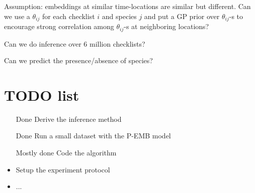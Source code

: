 \documentclass{article}
\begin{document}
Assumption: embeddings at similar time-locations are similar but different. Can we use a $\theta_{ij}$ for each checklist $i$ and species $j$ and put a GP prior over $\theta_{ij}$-s to encourage strong correlation among $\theta_{ij}$-s at neighboring locations?  

Can we do inference over 6 million checklists?

Can we predict the presence/absence of species?

\section{TODO list}
\begin{itemize}
\item [Done] Derive the inference method
\item [Done] Run a small dataset with the P-EMB model
\item [Mostly done] Code the algorithm
\item Setup the experiment protocol
\item ...
\end{itemize}
\end{document}
